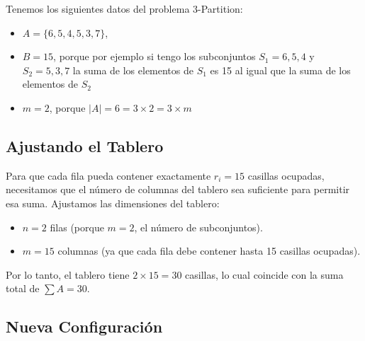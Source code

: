 \vskip0.5cm
Tenemos los siguientes datos del problema 3-Partition: 

\begin{itemize}
    \item $A = \{6, 5, 4, 5, 3, 7\}$,
    \item $B = 15$, porque por ejemplo si tengo los subconjuntos $S_{1}={6,5,4}$ y $S_{2}={5,3,7}$ la suma de los elementos de $S_{1}$ es 15 al igual que la suma de los elementos de $S_{2}$ 
    \item $m = 2$, porque $|A| = 6 = 3 \times 2 = 3 \times m$
\end{itemize}

\subsection*{Ajustando el Tablero}

Para que cada fila pueda contener exactamente $r_i = 15$ casillas ocupadas, necesitamos que el número de columnas del tablero sea suficiente para permitir esa suma. Ajustamos las dimensiones del tablero:

\begin{itemize}
    \item $n = 2$ filas (porque $m = 2$, el número de subconjuntos). %
    \item $m = 15$ columnas (ya que cada fila debe contener hasta 15 casillas ocupadas). %
\end{itemize}

Por lo tanto, el tablero tiene $2 \times 15 = 30$ casillas, lo cual coincide con la suma total de $\sum A = 30$. %

\subsection*{Nueva Configuración}

